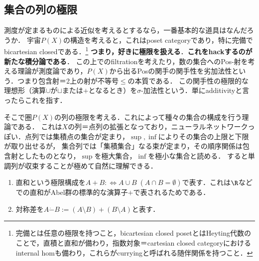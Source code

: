 \documentclass[uplatex, dvipdfmx]{jsreport}
\begin{document}
\subsection{集合の列の極限}

\begin{tcolorbox}[colframe=ForestGreen, colback=ForestGreen!10!white,breakable,colbacktitle=ForestGreen!40!white,coltitle=black,fonttitle=\bfseries\sffamily,
    title=積分論とは，集合の列による極限構成を基本言語とする理論である]
    測度が定まるものによる近似を考えるとするなら，一番基本的な道具はなんだろうか．
    宇宙$P(X)$の構造を考えると，これはposet categoryであり，特に完備でbicartesian closedである．\footnote{完備とは任意の極限を持つこと，bicartesian closed posetとはHeyting代数のことで，直積と直和が備わり，指数対象＝cartesian closed categoryにおけるinternal homも備わり，これらがcurryingと呼ばれる随伴関係を持つこと．}
    \textbf{つまり，好きに極限を扱える}．\textbf{これをhackするのが新たな積分論である}．
    この上でのfiltrationを考えたり，数の集合へのPos-射を考える理論が測度論であり，$P(X)$から出るPosの関手の関手性を劣加法性という．つまり包含射＝2上の射が不等号$\le$の本質である．
    この関手性の極限的な理想形（演算$\cup$が$\sqcup$または$+$となるとき）を$\sigma$-加法性という．単にadditivityと言ったらこれを指す．

    そこで圏$P(X)$の列の極限を考える．これによって種々の集合の構成を行う理論である．
    これは$X$の列＝点列の拡張となっており，ニューラルネットワークっぽい．点列では集積点の集合が定まり，$\sup,\inf$によりその集合の上限と下限が取り出せるが，
    集合列では「集積集合」なる束が定まり，その順序関係は包含射としたものとなり，$\sup$を極大集合，$\inf$を極小な集合と読める．
    すると単調列が収束することが極めて自然に理解できる．
\end{tcolorbox}

\begin{notation}\mbox{}
    \begin{enumerate}
        \item 直和という極限構成を$A+B:\Leftrightarrow A\cup B\;(A\cap B=\emptyset)$で表す．これは$\R$などでの直和がAbel群の標準的な演算子$+$で表されるためである．
        \item 対称差を$A\dot{-}B:=(A\setminus B)+(B\setminus A)$と表す．
    \end{enumerate}
\end{notation}
\end{document}
